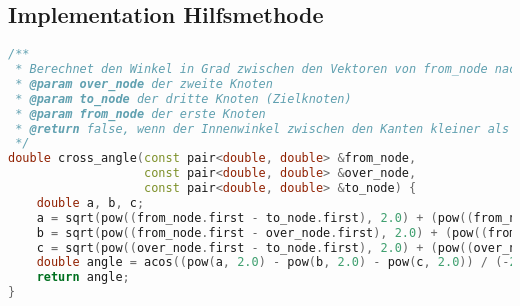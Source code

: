 \documentclass[a4paper,10pt,ngerman]{scrartcl}
\begin{document}
    \subsection{Implementation Hilfsmethode}\label{subsec:implementation-hilfsmethode}
    \begin{lstlisting}[frame=single,language=C++,title=Methode cross\_angle,breaklines=true,label={lst:code_crossAngle}]
/**
 * Berechnet den Winkel in Grad zwischen den Vektoren von from_node nach over_node und over_node nach to_node
 * @param over_node der zweite Knoten
 * @param to_node der dritte Knoten (Zielknoten)
 * @param from_node der erste Knoten
 * @return false, wenn der Innenwinkel zwischen den Kanten kleiner als 90° beträgt, andernfalls true
 */
double cross_angle(const pair<double, double> &from_node,
                   const pair<double, double> &over_node,
                   const pair<double, double> &to_node) {
    double a, b, c;
    a = sqrt(pow((from_node.first - to_node.first), 2.0) + (pow((from_node.second - to_node.second), 2.0)));
    b = sqrt(pow((from_node.first - over_node.first), 2.0) + (pow((from_node.second - over_node.second), 2.0)));
    c = sqrt(pow((over_node.first - to_node.first), 2.0) + (pow((over_node.second - to_node.second), 2.0)));
    double angle = acos((pow(a, 2.0) - pow(b, 2.0) - pow(c, 2.0)) / (-2 * b * c)) * 180 / M_PI;
    return angle;
}
    \end{lstlisting}
\end{document}
